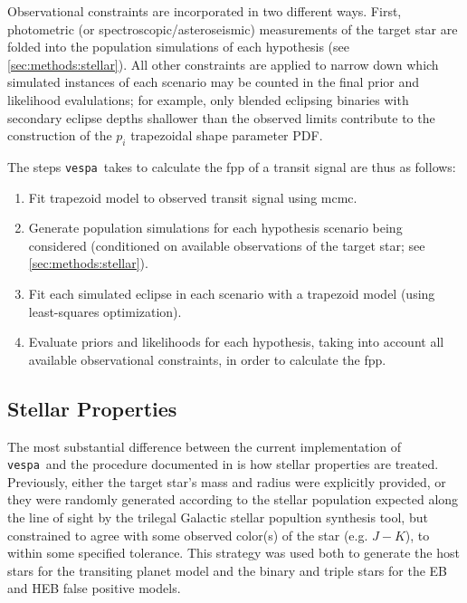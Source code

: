 \documentclass{emulateapj}
\newcommand{\vespa}{\texttt{vespa}}
\begin{document}
Observational constraints are incorporated in two different ways.
First, photometric (or spectroscopic/asteroseismic) measurements of
the target star are folded into the population simulations of each
hypothesis (see \autoref{sec:methods:stellar}).  All other constraints are
applied to narrow down which simulated instances of each scenario may
be counted in the final prior and likelihood evalulations; for example,
only blended eclipsing binaries with secondary eclipse depths
shallower than the observed limits contribute to the construction of
the $p_i$ trapezoidal shape parameter PDF.

The steps \vespa\ takes to calculate the \ac{fpp} of a transit signal
are thus as follows:
\begin{enumerate}
\item Fit trapezoid model to observed transit signal using \ac{mcmc}.
\item Generate population simulations for each hypothesis scenario
  being considered (conditioned on available observations of the
  target star; see \autoref{sec:methods:stellar}).
\item Fit each simulated eclipse in each scenario with a trapezoid
  model (using least-squares optimization).
\item Evaluate priors and likelihoods for each hypothesis, taking into
  account all available observational constraints, in order to
  calculate the \ac{fpp}.
\end{enumerate}


\subsection{Stellar Properties}
\label{sec:methods:stellar}

The most substantial difference between the current implementation of
\vespa\ and the procedure documented in  is
how stellar properties are treated.  Previously, either the target
star's mass and radius were explicitly provided, or they were randomly
generated according to the stellar population expected along the line
of sight by the \ac{trilegal} Galactic stellar popultion synthesis
tool, but constrained to agree with some observed color(s) of the star
(e.g. $J-K$), to within some specified tolerance.  This strategy was
used both to generate the host stars for the transiting planet model
and the binary and triple stars for the EB and HEB false positive
models.
\end{document}
